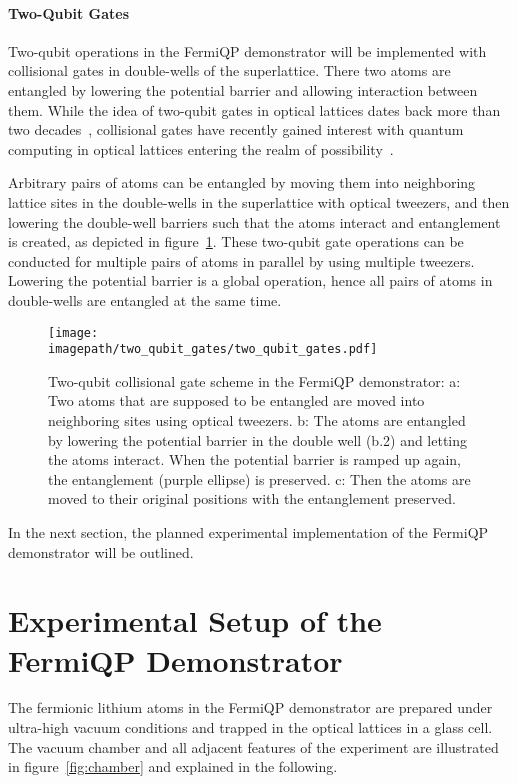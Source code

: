 \paragraph*{Two-Qubit Gates}
Two-qubit operations in the FermiQP demonstrator will be implemented with collisional gates in double-wells of the superlattice. There two atoms are entangled by lowering the potential barrier and allowing interaction between them. While the idea of two-qubit gates in optical lattices dates back more than two decades~\cite{jaksch_fast_2000, anderlini_controlled_2006,trotzky_time-resolved_2008}, collisional gates have recently gained interest with quantum computing in optical lattices entering the realm of possibility~\cite{dai_generation_2016, yang_cooling_2020, zhang_functional_2022}.

Arbitrary pairs of atoms can be entangled by moving them into neighboring lattice sites in the double-wells in the superlattice with optical tweezers, and then lowering the double-well barriers such that the atoms interact and entanglement is created, as depicted in figure~\ref{fig:two_qubit_gates}. These two-qubit gate operations can be conducted for multiple pairs of atoms in parallel by using multiple tweezers. Lowering the potential barrier is a global operation, hence all pairs of atoms in double-wells are entangled at the same time.

\begin{figure}
    \centering
    \texttt{[image: \\imagepath/two\_qubit\_gates/two\_qubit\_gates.pdf]}
    \caption{Two-qubit collisional gate scheme in the FermiQP demonstrator: a: Two atoms that are supposed to be entangled are moved into neighboring sites using optical tweezers. b: The atoms are entangled by lowering the potential barrier in the double well (b.2) and letting the atoms interact. When the potential barrier is ramped up again, the entanglement (purple ellipse) is preserved. c: Then the atoms are moved to their original positions with the entanglement preserved.}
    \label{fig:two_qubit_gates}
\end{figure}

\null

In the next section, the planned experimental implementation of the FermiQP demonstrator will be outlined.



\section{Experimental Setup of the FermiQP Demonstrator}
The fermionic lithium atoms in the FermiQP demonstrator are prepared under ultra-high vacuum conditions and trapped in the optical lattices in a glass cell. The vacuum chamber and all adjacent features of the experiment are illustrated in figure~\ref{fig:chamber} and explained in the following.


